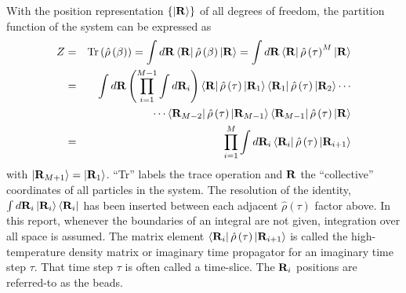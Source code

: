 \documentclass[12pt]{iopart}
\begin{document}
With the position representation $\left\{ \left| {\bf R} \right> \right\}$ of all degrees of freedom, 
the partition function of the system can be expressed as
\begin{eqnarray}
Z&=&{\rm Tr}\left(\hat{\rho}\left(\beta \right) \right)=\int d {\bf R}\left< {\bf R} \right|\hat{\rho}\left(\beta\right)\left| {\bf R} \right>=\int d {\bf R}\left< {\bf R} \right|\hat{\rho}\left(\tau\right)^M\left| {\bf R} \right> \nonumber\\
&=&\int d {\bf R} \left(\prod_{i=1}^{M-1}\int d{\bf R}_i\right)\left< {\bf R} \right|\hat{\rho}\left(\tau\right)\left| {\bf R}_1 \right>\left< {\bf R}_1 \right|\hat{\rho}\left(\tau\right)\left| {\bf R}_2 \right> \cdots \nonumber\\
&&\cdots \left< {\bf R}_{M-2} \right|\hat{\rho}\left(\tau\right)\left| {\bf R}_{M-1} \right>\left< {\bf R}_{M-1} \right|\hat{\rho}\left(\tau\right)\left| {\bf R} \right>\nonumber\\
&=&\prod_{i=1}^{M}\int d{\bf R}_i \left< {\bf R}_{i} \right|\hat{\rho}\left(\tau\right)\left| {\bf R}_{i+1} \right> \label{eqn:z1}
\end{eqnarray}
with $\left| {\bf R}_{M+1} \right>=\left| {\bf R}_{1} \right>$. ``Tr'' labels the trace operation and ${\bf R}$ the ``collective'' coordinates of all particles in the system. 
The resolution of the identity, $\int d {\bf R}_i \left| {\bf R}_i \right>\left< {\bf R}_i \right|$ has been inserted between each  adjacent $\hat{\rho}\left(\tau \right)$ factor above. 
In this report, whenever the boundaries of an integral are not given, integration over all space is assumed.
The matrix element $\left< {\bf R}_{i} \right|\hat{\rho}\left(\tau\right)\left| {\bf R}_{i+1} \right>$ is called the high-temperature density matrix or imaginary time propagator for an imaginary time step $\tau$. 
That time step $\tau$ is often called a time-slice.
The ${\bf R}_i$ positions are  referred-to as the beads. 
\end{document}
